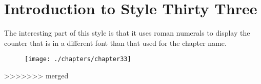 \chapter{Introduction to Style Thirty Three}

The interesting part of this style is that it uses roman numerals to display the counter that is in a different font than that used for the chapter name.
\medskip
\begin{figure}[ht]
\centering
\texttt{[image: ./chapters/chapter33]}
\end{figure}

>>>>>>> merged
